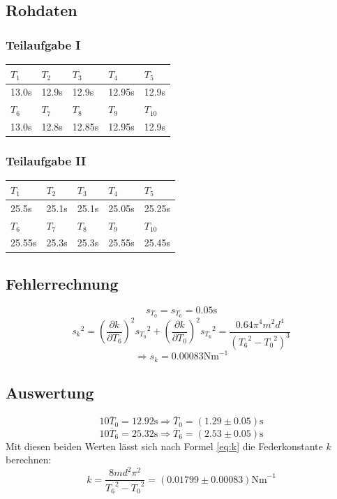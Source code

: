 \documentclass[12pt,a4paper]{article}
\begin{document}
\subsection*{Rohdaten}
\subsubsection*{Teilaufgabe I}
\begin{tabular}{|l|l|l|l|l|}
\hline
$T_{1}$&$T_{2}$&$T_{3}$&$T_{4}$&$T_{5}$\\
\hline
13.0s&12.9s&12.9s&12.95s&12.9s\\
\hline
\hline
$T_{6}$&$T_{7}$&$T_{8}$&$T_{9}$&$T_{10}$\\
\hline
13.0s&12.8s&12.85s&12.95s&12.9s\\
\hline
\end{tabular}

\subsubsection*{Teilaufgabe II}
\begin{tabular}{|l|l|l|l|l|}
\hline
$T_{1}$&$T_{2}$&$T_{3}$&$T_{4}$&$T_{5}$\\
\hline
25.5s&25.1s&25.1s&25.05s&25.25s\\
\hline
\hline
$T_{6}$&$T_{7}$&$T_{8}$&$T_{9}$&$T_{10}$\\
\hline
25.55s&25.3s&25.3s&25.55s&25.45s\\
\hline
\end{tabular}

\subsection*{Fehlerrechnung}
\[ s_{T_0} = s_{T_6} = 0.05\mbox{s} \]
\[ {s_k}^2 = \left( \frac{\partial k}{\partial T_6} \right)^2 {s_{T_0}}^2 + \left( \frac{\partial k}{\partial T_0} \right)^2 {s_{T_6}}^2 = \frac{0.64\pi^4m^2d^4}{({T_6}^2-{T_0}^2)^3} \]
\[ \Rightarrow s_k = 0.00083\mbox{Nm}^{-1} \]

\subsection*{Auswertung}
\[ 10\overline{T}_0 = 12.92\mbox{s} \Rightarrow \overline{T}_0 = (1.29 \pm 0.05) \mbox{s} \]
\[ 10\overline{T}_6 = 25.32\mbox{s} \Rightarrow \overline{T}_6 = (2.53 \pm 0.05) \mbox{s} \]
Mit diesen beiden Werten l\"asst sich nach Formel \ref{eq:k} die Federkonstante $k$ berechnen:
\[ k = \frac{8md^2\pi^2}{{T_6}^2 - {T_0}^2} = (0.01799 \pm 0.00083) \mbox{Nm}^{-1} \]
\end{document}
